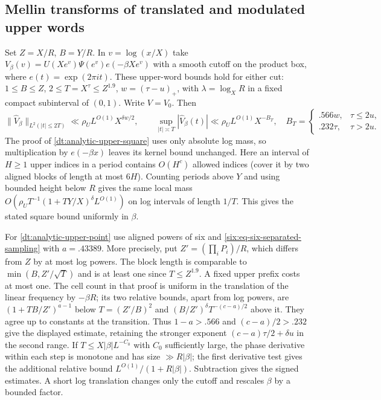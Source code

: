 \documentclass[11pt,a4paper]{article}
\theoremstyle{paperplain}
\numberwithin{equation}{section}
\begin{document}
\subsection{Mellin transforms of translated and modulated upper words}
\label{six:upper-mellin}
Set $Z=X/R$, $B=Y/R$. In $v=\log(x/X)$ take
$V_\beta(v)=U(Xe^v)\Psi(e^v)e(-\beta Xe^v)$ with a smooth
cutoff on the product box, where $e(t)=\exp(2\pi i t)$. These
upper-word bounds hold for either cut: $1\le B\le Z$, $2\le
T=X^\tau\le Z^{1.9}$, $w=(\tau-u)_+$, with $\lambda=\log_X R$
in a fixed compact subinterval of $(0,1)$. Write $V=V_0$. Then
\[
 \|\widehat V_\beta\|_{L^2(|t|\le2T)}
      \ll \rho_U L^{O(1)}X^{\delta w/2},\qquad
 \sup_{|t|\asymp T}|\widehat V_\beta(t)|
      \ll \rho_U L^{O(1)}X^{-B_T},
 \quad B_T=\begin{cases}.566w,&\tau\le2u,\\ .232\tau,&\tau>2u .
 \end{cases}
\]
The proof of \eqref{dt:analytic-upper-square} uses only absolute log
mass, so multiplication by $e(-\beta x)$ leaves its kernel bound
unchanged. Here an interval of $H\ge1$ upper indices in a period
contains $O(H^c)$ allowed indices (cover it by two aligned blocks of
length at most $6H$). Counting periods above $Y$ and using bounded
height below $R$ gives the same local mass
$O(\rho_U T^{-1}(1+TY/X)^\delta L^{O(1)})$ on log intervals of
length $1/T$. This gives the stated square bound uniformly in $\beta$.

For \eqref{dt:analytic-upper-point} use aligned powers of six and
\eqref{six:eq-six-separated-sampling} with $a=.43389$. More precisely,
put $Z'=(\prod_i P_i)/R$, which differs from $Z$ by at most log powers.
The block length is comparable to $\min(B,Z'/\sqrt T)$ and is at
least one since $T\le Z^{1.9}$. A fixed upper prefix costs at most one.
The cell count in that proof is uniform in the translation of the
linear frequency by $-\beta R$; its two relative bounds, apart from
log powers, are $(1+TB/Z')^{a-1}$ below $T=(Z'/B)^2$ and
$(B/Z')^\delta T^{-(c-a)/2}$ above it. They agree up to constants at
the transition. Thus $1-a>.566$ and $(c-a)/2>.232$ give the displayed
estimate, retaining the stronger exponent $(c-a)\tau/2+\delta u$
in the second range. If $T\le X|\beta|L^{-C_0}$ with $C_0$ sufficiently
large, the phase derivative within each step is monotone and has size
$\gg R|\beta|$; the first derivative test gives the additional relative
bound $L^{O(1)}/(1+R|\beta|)$. Subtraction gives the signed estimates.
A short log translation changes only the cutoff and rescales $\beta$
by a bounded factor.
\end{document}
